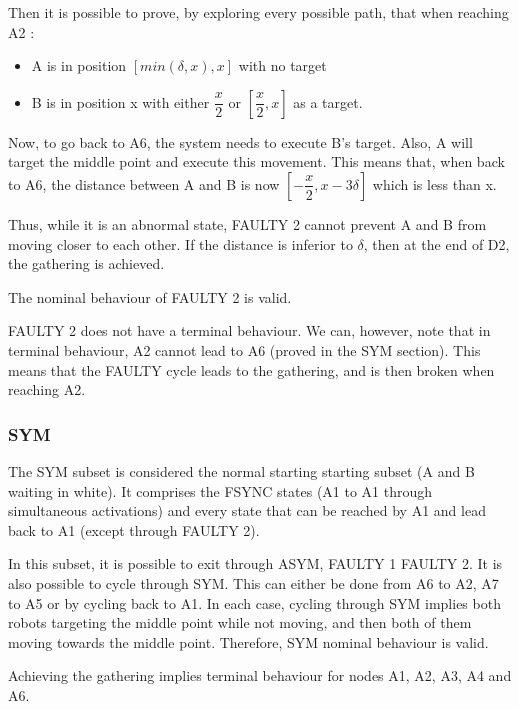 \documentclass[11pt]{article}
\begin{document}
Then it is possible to prove, by exploring every possible path, that when reaching A2  :

\begin{itemize}
\item A is in position $[min(\delta,x),x]$ with no target
\item B is in position x with either $\dfrac{x}{2}$ or $[\dfrac{x}{2},x]$ as a target.
\end{itemize}

Now, to go back to A6, the system needs to execute B's target. Also, A will target the middle point and execute this movement.
This means that, when back to A6, the distance between A and B is now $[-\dfrac{x}{2},x-3\delta]$ which is less than x.

Thus, while it is an abnormal state, FAULTY 2 cannot prevent A and B from moving closer to each other. If the distance is inferior to $\delta$, then at the end of D2, the gathering is achieved.

The nominal behaviour of FAULTY 2 is valid.

FAULTY 2 does not have a terminal behaviour. We can, however, note that in terminal behaviour, A2 cannot lead to A6 (proved in the SYM section). This means that the FAULTY cycle leads to the gathering, and is then broken when reaching A2.



\subsubsection{SYM}
The SYM subset is considered the normal starting starting subset (A and B waiting in white). It comprises the FSYNC states (A1 to A1 through simultaneous activations) and every state that can be reached by A1 and lead back to A1 (except through FAULTY 2).  

In this subset, it is possible to exit through ASYM, FAULTY 1 FAULTY 2. It is also possible to cycle through SYM. This can either be done from A6 to A2, A7 to A5 or by cycling back to A1. In each case, cycling through SYM implies both robots targeting the middle point while not moving, and then both of them moving towards the middle point. Therefore, SYM nominal behaviour is valid.

Achieving the gathering implies terminal behaviour for nodes A1, A2, A3, A4 and A6.
\end{document}
